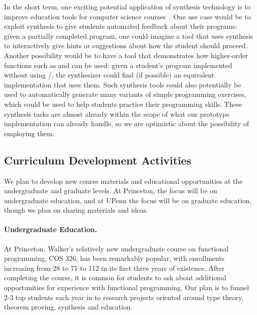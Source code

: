 In the short term, one exciting potential application of synthesis
technology is to improve education tools for computer science
courses~\cite{singh-pldi-2013}.  One use case would be to exploit
synthesis to give students automated feedback about their programs:
given a partially completed program, one could imagine a tool that
uses synthesis to interactively give hints or suggestions about how
the student should proceed.  Another possibility would be to have a
tool that demonstrates how higher-order functions such as  and
 can be used: given a student's program implemented without
using /, the synthesizer could find (if possible) an
equivalent implementation that uses them.  Such synthesis tools could
also potentially be used to automatically generate many variants of
simple programming exercises, which could be used to help students
practice their programming skills.  These synthesis tasks are almost
already within the scope of what our prototype implementation can
already handle, so we are optimistic about the possibility of
employing them.  

\subsection{Curriculum Development Activities}

We plan to develop new course materials and educational opportunities
at the undergraduate and graduate levels.  At Princeton, the focus
will be on undergraduate education, and at UPenn the focus will be on
graduate education, though we plan on sharing materials and ideas.

\paragraph*{Undergraduate Education.}
At Princeton, Walker's relatively new undergraduate
course on functional programming, COS 326, has been remarkably popular,
with enrollments increasing from 28 to 71 to 112 in its first three
years of existence.  After completing the course, it is common for students
to ask about additional opportunities for experience
with functional programming. Our plan is to funnel 2-3 top
students each year in to research projects
oriented around type theory, theorem proving, synthesis and education.  

